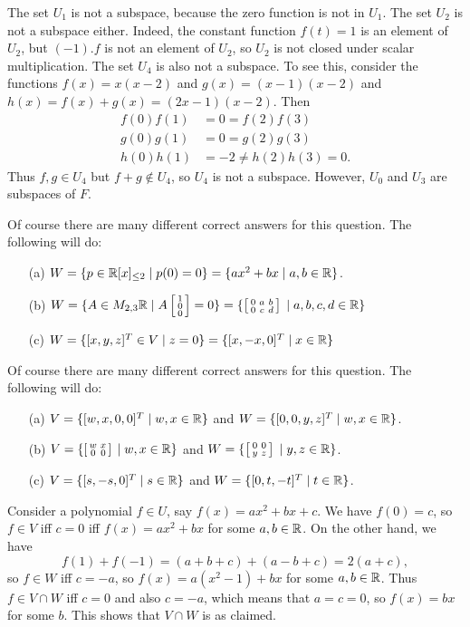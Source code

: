  The set $U_1$ is not a subspace, because the zero function
 is not in $U_1$.  The set $U_2$ is not a subspace either.
 Indeed, the constant function $f(t)=1$ is an element of
 $U_2$, but $(-1).f$ is not an element of $U_2$, so $U_2$ is
 not closed under scalar multiplication.  The set $U_4$ is
 also not a subspace.  To see this, consider the functions
 $f(x)=x(x-2)$ and $g(x)=(x-1)(x-2)$ and
 $h(x)=f(x)+g(x)=(2x-1)(x-2)$.  Then
 \begin{align*}
  f(0)f(1) &= 0 = f(2)f(3) \\
  g(0)g(1) &= 0 = g(2)g(3) \\
  h(0)h(1) &= -2 \neq h(2)h(3) = 0.
 \end{align*}
 Thus $f,g\in U_4$ but $f+g\not\in U_4$, so $U_4$ is not a
 subspace.  However, $U_0$ and $U_3$ are subspaces of $F$.
\EndDeferredSolution

 Of course there are many different correct answers for this
 question.  The following will do:
 \begin{itemize}
  \item[(a)]
   $W=\{p\in {\mathbb{R}}[x]_{\leq 2}\;|\; p(0)=0\}=\{ax^2+bx\;|\; a,b\in{\mathbb{R}}\}$.
  \item[(b)]
   $W=\{A\in M_{2,3}{\mathbb{R}}\;|\; A\left[\begin{smallmatrix} 1\\0\\0\end{smallmatrix}\right] = 0\}=
     \{\left[\begin{smallmatrix} 0&a&b\\ 0&c&d\end{smallmatrix}\right] \;|\; a,b,c,d\in{\mathbb{R}}\}$
  \item[(c)]
   $W=\{[x,y,z]^T\in V\;|\; z=0\}=\{[x,-x,0]^T\;|\; x\in{\mathbb{R}}\}$
 \end{itemize}
\EndDeferredSolution

 Of course there are many different correct answers for this
 question.  The following will do:
 \begin{itemize}
  \item[(a)]
   $V=\{[w,x,0,0]^T\;|\; w,x\in{\mathbb{R}}\}$ and
   $W=\{[0,0,y,z]^T\;|\; w,x\in{\mathbb{R}}\}$.
  \item[(b)]
   $V=\{\left[\begin{smallmatrix} w&x\\0&0\end{smallmatrix}\right]\;|\; w,x\in{\mathbb{R}}\}$ and
   $W=\{\left[\begin{smallmatrix} 0&0\\y&z\end{smallmatrix}\right]\;|\; y,z\in{\mathbb{R}}\}$.
  \item[(c)]
   $V=\{[s,-s,0]^T\;|\; s\in{\mathbb{R}}\}$ and
   $W=\{[0,t,-t]^T\;|\; t\in{\mathbb{R}}\}$.
 \end{itemize}
\EndDeferredSolution

 Consider a polynomial $f\in U$, say $f(x)=ax^2+bx+c$.  We
 have $f(0)=c$, so $f\in V$ iff $c=0$ iff $f(x)=ax^2+bx$ for
 some $a,b\in{\mathbb{R}}$.  On the other hand, we have
 \[ f(1) + f(-1) = (a+b+c) + (a-b+c) = 2(a+c), \]
 so $f\in W$ iff $c=-a$, so $f(x)=a(x^2-1)+bx$ for some
 $a,b\in{\mathbb{R}}$.  Thus $f\in V\cap W$ iff $c=0$ and also $c=-a$,
 which means that $a=c=0$, so $f(x)=bx$ for some $b$.  This
 shows that $V\cap W$ is as claimed.

